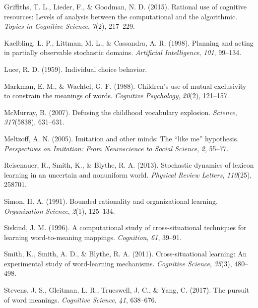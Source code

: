 \documentclass[english,,man,floatsintext]{apa6}
\begin{document}
\leavevmode\hypertarget{ref-griffiths2015}{}%
Griffiths, T. L., Lieder, F., \& Goodman, N. D. (2015). Rational use of cognitive resources: Levels of analysis between the computational and the algorithmic. \emph{Topics in Cognitive Science}, \emph{7}(2), 217--229.

\leavevmode\hypertarget{ref-kaelbling1998}{}%
Kaelbling, L. P., Littman, M. L., \& Cassandra, A. R. (1998). Planning and acting in partially observable stochastic domains. \emph{Artificial Intelligence}, \emph{101}, 99--134.

\leavevmode\hypertarget{ref-luce1959}{}%
Luce, R. D. (1959). Individual choice behavior.

\leavevmode\hypertarget{ref-markman1988}{}%
Markman, E. M., \& Wachtel, G. F. (1988). Children's use of mutual exclusivity to constrain the meanings of words. \emph{Cognitive Psychology}, \emph{20}(2), 121--157.

\leavevmode\hypertarget{ref-mcmurray2007}{}%
McMurray, B. (2007). Defusing the childhood vocabulary explosion. \emph{Science}, \emph{317}(5838), 631--631.

\leavevmode\hypertarget{ref-meltzoff2005}{}%
Meltzoff, A. N. (2005). Imitation and other minds: The ``like me'' hypothesis. \emph{Perspectives on Imitation: From Neuroscience to Social Science}, \emph{2}, 55--77.

\leavevmode\hypertarget{ref-reisenauer2013}{}%
Reisenauer, R., Smith, K., \& Blythe, R. A. (2013). Stochastic dynamics of lexicon learning in an uncertain and nonuniform world. \emph{Physical Review Letters}, \emph{110}(25), 258701.

\leavevmode\hypertarget{ref-simon1991}{}%
Simon, H. A. (1991). Bounded rationality and organizational learning. \emph{Organization Science}, \emph{2}(1), 125--134.

\leavevmode\hypertarget{ref-siskind1996}{}%
Siskind, J. M. (1996). A computational study of cross-situational techniques for learning word-to-meaning mappings. \emph{Cognition}, \emph{61}, 39--91.

\leavevmode\hypertarget{ref-smith2011}{}%
Smith, K., Smith, A. D., \& Blythe, R. A. (2011). Cross-situational learning: An experimental study of word-learning mechanisms. \emph{Cognitive Science}, \emph{35}(3), 480--498.

\leavevmode\hypertarget{ref-stevens2017}{}%
Stevens, J. S., Gleitman, L. R., Trueswell, J. C., \& Yang, C. (2017). The pursuit of word meanings. \emph{Cognitive Science}, \emph{41}, 638--676.
\end{document}
